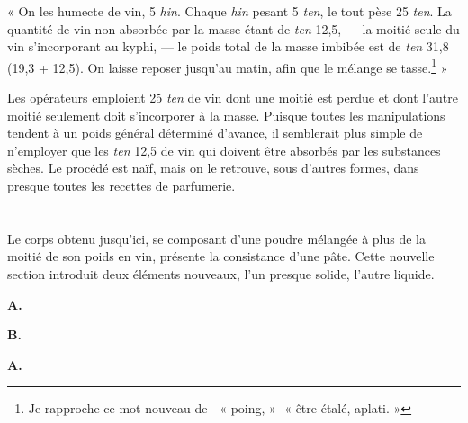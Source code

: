 \documentclass[a4paper, 11pt, oneside, landscape]{article}
\newcommand*\hieroAAAM{}
\newcommand*\hieroAAAN{}
\newcommand*\hieroAAFT{}
\newcommand*\hieroAAGN{}
\newcommand*\hieroAAGP{}
\newcommand*\hieroAAHC{\raisebox{1ex}{}}
\newcommand*\hieroAAIG{}
\newcommand*\hieroAAIT{}
\newcommand*\hieroAAIU{}
\newcommand*\hieroAALO{}
\newcommand*\hieroAALP{}
\newcommand*\hieroAAMQ{}
\newcommand*\hieroAANF{}
\newcommand*\hieroAANN{}
\newcommand*\hieroAANO{}
\newcommand*\hieroAANP{}
\newcommand*\hieroAANQ{}
\newcommand*\hieroAANR{}
\newcommand*\hieroAANS{}
\newcommand*\hieroAANT{}
\newcommand*\hieroAANU{}
\newcommand*\hieroAANV{}
\newcommand*\hieroAANW{}
\newcommand*\hieroAANX{}
\newcommand*\hieroAANY{}
\newcommand*\hieroAANZ{}
\newcommand*\hieroAAOA{}
\newcommand*\hieroAAOB{}
\newcommand*\hieroAAOC{}
\newcommand*\hieroAAOD{}
\newcommand*\hieroAAOE{\raisebox{0.6ex}{}}
\newcommand*\hieroAAOF{}
\newcommand*\hieroAAOG{\raisebox{0.4ex}{}}
\newcommand*\hieroAAOH{}
\begin{document}
« On les humecte de vin, 5 \emph{hin}. Chaque \emph{hin} pesant 5 \emph{ten}, le tout pèse 25 \emph{ten}. La quantité de vin non absorbée par la masse étant de \emph{ten} 12,5, --- la moitié seule du vin s'incorporant au kyphi, --- le poids total de la masse imbibée est de \emph{ten} 31,8 (19,3 + 12,5). On laisse reposer jusqu'au matin, afin que le mélange se tasse.\footnote{Je rapproche ce mot nouveau de $\hieroAAOF\:\hieroAAOG$ « poing, » $\hieroAAOH$ « être étalé, aplati. »} »

Les opérateurs emploient 25 \emph{ten} de vin dont une moitié est perdue et dont l'autre moitié seulement doit s'incorporer à la masse. Puisque toutes les manipulations tendent à un poids général déterminé d'avance, il semblerait plus simple de n'employer que les \emph{ten} 12,5 de vin qui doivent être absorbés par les substances sèches. Le procédé est naïf, mais on le retrouve, sous d'autres formes, dans presque toutes les recettes de parfumerie.
\clearpage
\section{}
\paragraph{}
Le corps obtenu jusqu'ici, se composant d'une poudre mélangée à plus de la moitié de son poids en vin, présente la consistance d'une pâte. Cette nouvelle section introduit deux éléments nouveaux, l'un presque solide, l'autre liquide.

\hspace*{10mm}\textbf{A.}\hspace*{5mm} $\hieroAANN\:\hieroAAAN\:\hieroAANO\:\hieroAANO\:\hieroAANP\:\hieroAANQ\:\hieroAANF\:\hieroAAIG\:\hieroAAIT\:\hieroAAMQ$ \hspace*{7mm} $\hieroAANR\:\hieroAANS\:\hieroAAHC\:\hieroAALO$

\hspace*{10mm}\textbf{B.}\hspace*{5mm} $\hieroAAAM\:\hieroAANT\:\hieroAANU\:\hieroAANV\:\hieroAANW\:\hieroAANQ\:\hieroAANF\:\hieroAAIG\:\hieroAAGN\:\hieroAAFT\:\hieroAAMQ$ \hspace*{5mm} $\hieroAANR\:\hieroAANX\:\hieroAANS\:\hieroAALO$

\hspace*{10mm}\textbf{A.}\hspace*{5mm} $\hieroAAIT\:\hieroAAIU\:\hieroAANY\:\hieroAAIT\:\hieroAAMQ\:\hieroAALP$ \hspace*{8mm} $\hieroAAGP\:\hieroAANZ\:\hieroAAOA\:\hieroAAOB\:\hieroAAOC\:\hieroAAOD\:\hieroAAOE$
\end{document}
